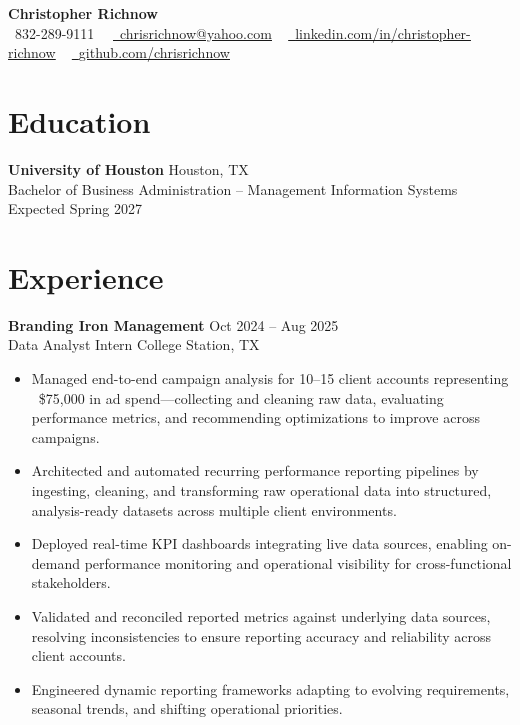 \documentclass[10.5pt]{article}
\begin{document}
\begin{center}
{\LARGE \textbf{Christopher Richnow}} \\[3pt]
 \small \raisebox{-0.1\height}\faPhone\ 832-289-9111\ ~ \href{mailto:chrisrichnow@yahoo.com}{\raisebox{-0.2\height}\faEnvelope\  \underline{chrisrichnow@yahoo.com}} ~
    \href{https://linkedin.com/in/christopher-richnow}{\raisebox{-0.2\height}\faLinkedin\ \underline{linkedin.com/in/christopher-richnow}}  ~
    \href{https://github.com/chrisrichnow}{\raisebox{-0.2\height}\faGithub\ \underline{github.com/chrisrichnow}}
    \vspace{-8pt}
\end{center}

\vspace{1pt}


\section*{Education}
\textbf{University of Houston} \hfill Houston, TX \\
Bachelor of Business Administration – Management Information Systems \hfill Expected Spring 2027

\section*{Experience}
\textbf{Branding Iron Management} \hfill Oct 2024 -- Aug 2025 \\
Data Analyst Intern \hfill College Station, TX

\begin{itemize}[leftmargin=*, itemsep=0pt, topsep=1pt]
\item Managed end-to-end campaign analysis for 10–15 client accounts representing ~\$75,000 in ad spend—collecting and cleaning raw data, evaluating performance metrics, and recommending optimizations to improve across campaigns.
\item Architected and automated recurring performance reporting pipelines by ingesting, cleaning, and transforming raw operational data into structured, analysis-ready datasets across multiple client environments.
\item Deployed real-time KPI dashboards integrating live data sources, enabling on-demand performance monitoring and operational visibility for cross-functional stakeholders.
\item Validated and reconciled reported metrics against underlying data sources, resolving inconsistencies to ensure reporting accuracy and reliability across client accounts.
\item Engineered dynamic reporting frameworks adapting to evolving requirements, seasonal trends, and shifting operational priorities.
\end{itemize}
\end{document}
